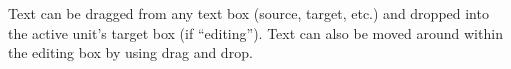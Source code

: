 Text can be dragged from any text box (source, target, etc.) and dropped into the active unit's target box (if ``editing'').
Text can also be moved around within the editing box by using drag and drop.

%
%
%
%
